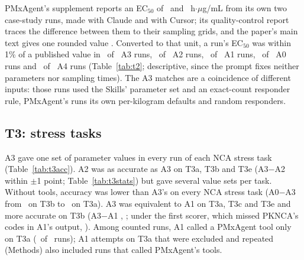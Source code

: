 \documentclass[11pt]{article}
\begin{document}
PMxAgent's supplement reports an EC$_{50}$ of \numTtwoPmxEcClaude\ and \numTtwoPmxEcCursor\ h$\cdot\mu$g/mL from its
own two case-study runs, made with Claude and with Cursor; its quality-control report traces the difference between
them to their sampling grids, and the paper's main text gives one rounded value \cite{bloomingdale2026pmxagent}.
Converted to that unit, a run's EC$_{50}$ was within 1\% of a published value in \numTtwoAthreeEcPmx\ of
\numTtwoAthreeEcConv\ A3 runs, \numTtwoAtwoEcPmx\ of \numTtwoAtwoEcConv\ A2 runs, \numTtwoAoneEcPmx\ of
\numTtwoAoneEcConv\ A1 runs, \numTtwoAzeroEcPmx\ of \numTtwoAzeroEcConv\ A0 runs and \numTtwoAfourEcPmx\ of
\numTtwoAfourEcConv\ A4 runs (Table~\ref{tab:t2}; descriptive, since the prompt fixes neither parameters nor sampling
times). The A3 matches are a coincidence of different inputs: those runs used the Skills' parameter set and an
exact-count responder rule, PMxAgent's runs its own per-kilogram defaults and random responders.

\begin{table}[t]
\centering\small
\caption{T2 case study per arm. Completed: \texttt{results.json} with all three dose groups. Checked: runs whose
simulated data the scorer could read. Consistent: mean percentage of reported group means (AUC$_\mathrm{last}$,
$C_\mathrm{max}$) within 1\% of the means recomputed from the run's own simulated data (AUC$_\mathrm{last}$ by the
linear-up/log-down rule). $^\dagger$Either AUC rule accepted (sensitivity analysis). EC$_{50}$ values are compared at
three significant digits; the summary was chosen after the T2 data were seen. $^\S$Runs whose EC$_{50}$, converted to
h$\cdot\mu$g/mL, lies within 1\% of either value in PMxAgent's supplement, of the runs whose unit could be converted;
descriptive, chosen after the T2 data were seen.}
\label{tab:t2}
\resizebox{\linewidth}{!}{}
\end{table}

\subsection{T3: stress tasks}
A3 gave one set of parameter values in every run of each NCA stress task (Table~\ref{tab:t3acc}).
A2 was as accurate as A3 on T3a, T3b and T3e (A3$-$A2 within $\pm$1 point; Table~\ref{tab:t3stats}) but gave several
value sets per task. Without tools, accuracy was lower than A3's on every NCA stress task (A0$-$A3 from
\numTthreebAzeroVsAthreeDiff\ on T3b to \numTthreeaAzeroVsAthreeDiff\ on T3a). A3 was equivalent to A1 on T3a, T3c
and T3e and more accurate on T3b (A3$-$A1 \numTthreebAthreeVsAoneDiff, \numTthreebAthreeVsAoneCI; under the first
scorer, which missed PKNCA's codes in A1's output, \numTthreebAthreeVsAoneVoneDiff). Among counted runs, A1 called a
PMxAgent tool only on T3a (\numTthreeaAonePmxRuns\ of \numTthreeaAonePmxKnown\ runs); A1 attempts on T3a that were
excluded and repeated (Methods) also included runs that called PMxAgent's tools.
\end{document}
